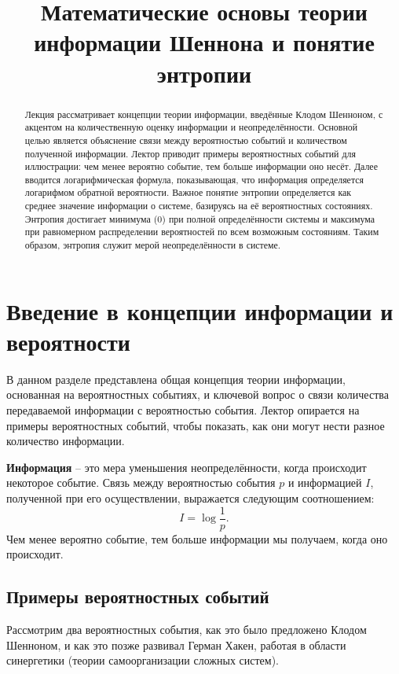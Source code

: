 \documentclass[12pt,a4paper]{article}
\title{Математические основы теории информации Шеннона и понятие энтропии}
\newenvironment{defbox}[1][]{%
  \begin{tcolorbox}[enhanced, breakable, colback=defcolor, colframe=green!50!black, title=#1, fonttitle=\bfseries, arc=3pt, boxrule=0.5pt]
}{\end{tcolorbox}}
\begin{document}
\maketitle
\begin{abstract}Лекция рассматривает концепции теории информации, введённые Клодом Шенноном, с акцентом на количественную оценку информации и неопределённости. Основной целью является объяснение связи между вероятностью событий и количеством полученной информации. Лектор приводит примеры вероятностных событий для иллюстрации: чем менее вероятно событие, тем больше информации оно несёт. Далее вводится логарифмическая формула, показывающая, что информация определяется логарифмом обратной вероятности. Важное понятие энтропии определяется как среднее значение информации о системе, базируясь на её вероятностных состояниях. Энтропия достигает минимума (0) при полной определённости системы и максимума при равномерном распределении вероятностей по всем возможным состояниям. Таким образом, энтропия служит мерой неопределённости в системе.\end{abstract}

\section{Введение в концепции информации и вероятности}

В данном разделе представлена общая концепция теории информации, основанная на вероятностных событиях, и ключевой вопрос о связи количества передаваемой информации с вероятностью события. Лектор опирается на примеры вероятностных событий, чтобы показать, как они могут нести разное количество информации.

\begin{defbox}[Информация и вероятность]
\textbf{Информация} – это мера уменьшения неопределённости, когда происходит некоторое событие. Связь между вероятностью события $p$ и информацией $I$, полученной при его осуществлении, выражается следующим соотношением:
\[
I = \log \frac{1}{p}.
\]
Чем менее вероятно событие, тем больше информации мы получаем, когда оно происходит.
\end{defbox}

\subsection{Примеры вероятностных событий}

Рассмотрим два вероятностных события, как это было предложено Клодом Шенноном, и как это позже развивал Герман Хакен, работая в области синергетики (теории самоорганизации сложных систем).
\end{document}
